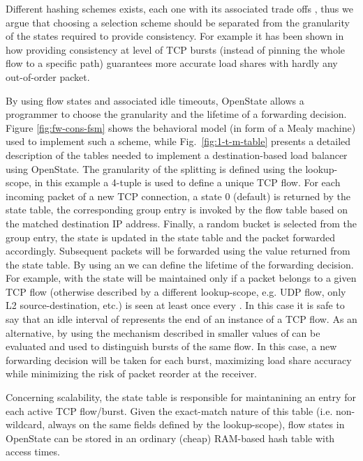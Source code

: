 \documentclass[10pt,conference]{IEEEtran}
\begin{document}
Different hashing schemes exists, each one with its associated trade offs \cite{Zhi00}, thus we argue that choosing a selection scheme should be separated from the granularity of the states required to provide consistency. For example it has been shown in \cite{kandula07} how providing consistency at level of TCP bursts (instead of pinning the whole flow to a specific path) guarantees more accurate load shares with hardly any out-of-order packet.

By using flow states and associated idle timeouts, OpenState allows a programmer to choose the granularity and the lifetime of a forwarding decision. Figure \ref{fig:fw-cons-fsm} shows the behavioral model (in form of a Mealy machine) used to implement such a scheme, while Fig.~\ref{fig:1-t-m-table} presents a detailed description of the tables needed to implement a destination-based load balancer using OpenState. The granularity of the splitting is defined using the lookup-scope, in this example a 4-tuple is used to define a unique TCP flow. For each incoming packet of a new TCP connection, a state 0 (default) is returned by the state table, the corresponding group entry is invoked by the flow table based on the matched destination IP address. Finally, a random bucket is selected from the group entry, the state is updated in the state table and the packet forwarded accordingly. Subsequent packets will be forwarded using the value returned from the state table. By using an  we can define the lifetime of the forwarding decision. For example, with  the state will be maintained only if a packet belongs to a given TCP flow (otherwise described by a different lookup-scope, e.g. UDP flow, only L2 source-destination, etc.) is seen at least once every . In this case it is safe to say that an idle interval of  represents the end of an instance of a TCP flow. As an alternative, by using the mechanism described in \cite{kandula07} smaller values of  can be evaluated and used to distinguish bursts of the same flow. In this case, a new forwarding decision will be taken for each burst, maximizing load share accuracy while minimizing the risk of packet reorder at the receiver.

Concerning scalability, the state table is responsible for maintanining an entry for each active TCP flow/burst. Given the exact-match nature of this table (i.e. non-wildcard, always on the same fields defined by the lookup-scope), flow states in OpenState can be stored in an ordinary (cheap) RAM-based hash table with  access times. 
\end{document}

